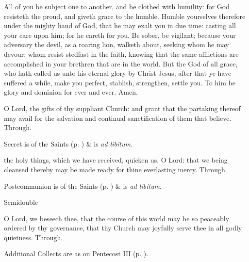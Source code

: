  All of you be subject one to another, and be clothed with humility: for God resisteth the proud, and giveth grace to the humble. %
Humble yourselves therefore under the mighty hand of God, that he may exalt you in due time: casting all your care upon him; for he careth for you. Be sober, be vigilant; because your adversary the devil, as a roaring lion, walketh about, seeking whom he may devour: whom resist stedfast in the faith, knowing that the same afflictions are accomplished in your brethren that are in the world. But the God of all grace, who hath called us unto his eternal glory by Christ Jesus, after that ye have suffered a while, make you perfect, stablish, strengthen, settle you. To him be glory and dominion for ever and ever. Amen.

\secret
{} O Lord, the gifts of thy suppliant Church: and grant that the partaking thereof may avail for the salvation and continual sanctification of them that believe. Through.
\begin{rubric}
     Secret is of the Saints (p. \pageref{SPSaints}) \&  is \emph{ad libitum}.
\end{rubric}

\postcommunion
{} the holy things, which we have received, quicken us, O Lord: that we being cleansed thereby may be made ready for thine everlasting mercy. Through.
\begin{rubric}
     Postcommunion is of the Saints (p. \pageref{SPSaints}) \&  is \emph{ad libitum}.
\end{rubric}

\begin{inhead}
    {Semidouble}
\end{inhead}

\collect
{} O Lord, we beseech thee, that the course of this world may be so peaceably ordered by thy governance, that thy Church may joyfully serve thee in all godly quietness. Through.
\begin{rubric}
    Additional Collects are as on Pentecost III (p. \pageref{PentecostIII}).
\end{rubric}

